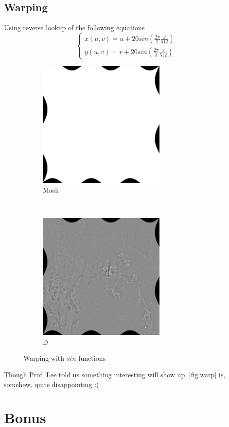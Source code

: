\documentclass[12pt]{article}
\begin{document}
\subsection*{Warping}
Using reverse lookup of the following equations
\begin{equation}
\begin{cases}
	x(u, v) = u + 20 sin(\frac{2 \pi}{2} \frac{y}{512} ) \\
	y(u, v) = v + 20 sin(\frac{2 \pi}{3} \frac{x}{512} )
\end{cases}
\end{equation}

\begin{figure}[H]
    \centering
    \begin{subfigure}[t]{0.5\textwidth}
        \centering
        \includegraphics[height=2.5in]{images/warp_mask}
        \caption{Mask}
    \end{subfigure}%
    ~
    \begin{subfigure}[t]{0.5\textwidth}
        \centering
        \includegraphics[height=2.5in]{images/warp_c}
        \caption{D}
    \end{subfigure}
    \caption{Warping with $sin$ functions}
    \label{fig:warp}
\end{figure}
Though Prof. Lee told us something interesting will show up, \autoref{fig:warp} is, somehow, quite disappointing :(

\section*{Bonus}
\end{document}
